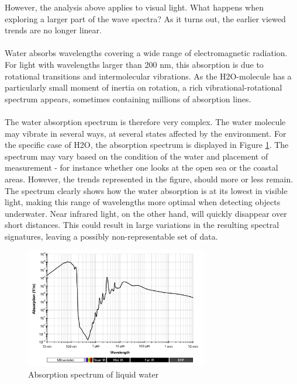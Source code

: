 \vspace{1.6cm}
\noindent
However, the analysis above applies to visual light. What happens when exploring a larger part of the wave spectra? As it turns out, the earlier viewed trends are no longer linear.
\\\\
Water absorbs wavelengths covering a wide range of electromagnetic radiation. For light with wavelengths larger than 200 nm, this absorption is due to rotational transitions and intermolecular vibrations. As the H2O-molecule has a particularly small moment of inertia on rotation, a rich vibrational-rotational spectrum appears, sometimes containing millions of absorption lines. 
\\\\
The water absorption spectrum is therefore very complex. The water molecule may vibrate in several ways, at several states affected by the environment. For the specific case of H2O, the absorption spectrum is displayed in Figure \ref{fig:absspec}. The spectrum may vary based on the condition of the water and placement of measurement - for instance whether one looks at the open sea or the coastal areas. However, the trends represented in the figure, should more or less remain. The spectrum clearly shows how the water absorption is at its lowest in visible light, making this range of wavelengths more optimal when detecting objects underwater. Near infrared light, on the other hand, will quickly disappear over short distances. This could result in large variations in the resulting spectral signatures, leaving a possibly non-representable set of data.

\begin{figure}[H]
    \centering
    \includegraphics[width=8cm]{Images/theory/Absorption_spectrum_of_liquid_water.png}
    \caption{Absorption spectrum of liquid water}
    \label{fig:absspec}
\end{figure}


